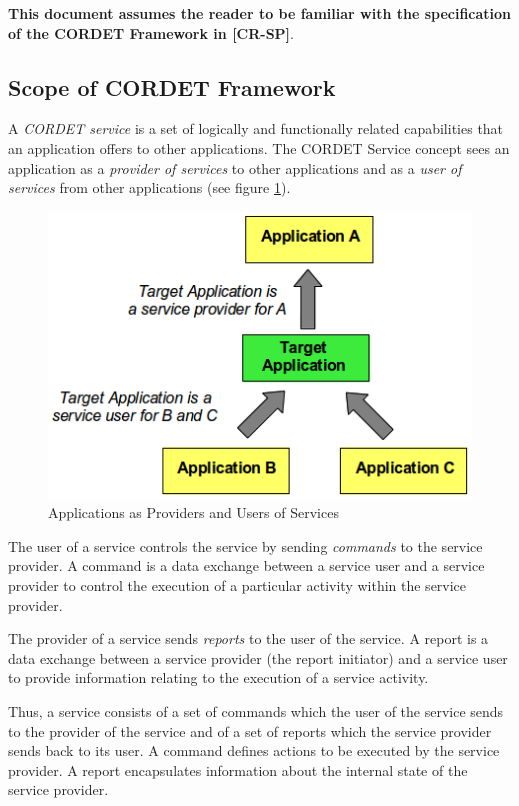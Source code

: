 \documentclass[a4paper,10pt]{article}
\begin{document}
\textbf{This document assumes the reader to be familiar with the specification of the CORDET Framework in [CR-SP]}. 

\subsection{Scope of CORDET Framework}\label{sec:ScopeCrFw}
A \textit{CORDET service} is a set of logically and functionally related capabilities that an application offers to other applications. The CORDET Service concept sees an application as a \textit{provider of services} to other applications and as a \textit{user of services} from other applications (see figure \ref{fig:ServConcept}).

\begin{figure}[ht]
 \centering
 \includegraphics[scale=0.4,keepaspectratio=true]{ServConcept.png}
 \caption{Applications as Providers and Users of Services}
 \label{fig:ServConcept}
\end{figure}

The user of a service controls the service by sending \textit{commands} to the service provider. A command is a data exchange between a service user and a service provider to control the execution of a particular activity within the service provider. 

The provider of a service sends \textit{reports} to the user of the service. A report is a data exchange between a service provider (the report initiator) and a service user to provide information relating to the execution of a service activity.

Thus, a service consists of a set of commands which the user of the service sends to the provider of the service and of a set of reports which the service provider sends back to its user. A command defines actions to be executed by the service provider. A report encapsulates information about the internal state of the service provider.
\end{document}
